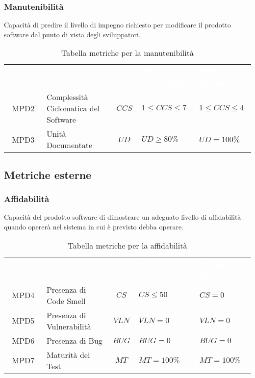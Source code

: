 \subsubsection{Manutenibilità} 
Capacità di predire il livello di impegno richiesto per modificare il prodotto software dal punto di vista degli sviluppatori.           
\begin{longtable}{ c C{4cm} c C{3.5cm} C{3.5cm}}
	\caption{Tabella metriche per la manutenibilità}\\
	\textcolor{white}{\textbf{Metrica}} & \textcolor{white}{\textbf{Nome}} & \textcolor{white}{\textbf{Sigla}} & \textcolor{white}{\textbf{Range Accettabile}} & \textcolor{white}{\textbf{Range Ottimale}}\\
	MPD2 & Complessità Ciclomatica del Software & $CCS $ & $1 \leq CCS \leq 7 $ & $1 \leq CCS \leq 4$\\
	MPD3 & Unità Documentate & $UD$ & $UD \geq 80\%$ & $UD = 100\%$\\
\end{longtable}
              
\vspace{0.3cm}      
\subsection{Metriche esterne}

\subsubsection{Affidabilità}
Capacità del prodotto software di dimostrare un adeguato livello di affidabilità quando opererà nel sistema in cui è previsto debba operare.

\begin{longtable}{ c C{4cm} c C{3.5cm} C{3.5cm}}
	\caption{Tabella metriche per la affidabilità}\\
	\textcolor{white}{\textbf{Metrica}} & \textcolor{white}{\textbf{Nome}} & \textcolor{white}{\textbf{Sigla}} & \textcolor{white}{\textbf{Range Accettabile}} & \textcolor{white}{\textbf{Range Ottimale}}\\
	MPD4 & Presenza di Code Smell & $CS$ & $CS \leq 50 $ & $CS = 0 $\\
	MPD5 & Presenza di Vulnerabilità & $VLN$ & $VLN = 0$ & $VLN = 0 $\\
	MPD6 & Presenza di Bug & $BUG$ & $BUG = 0 $ & $BUG = 0 $\\
	MPD7 & Maturità dei Test & $MT$ & $MT = 100\%$ & $MT = 100\%$\\
\end{longtable}

